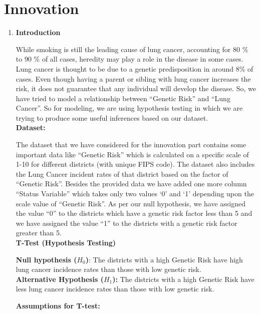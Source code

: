 \documentclass{article}
\begin{document}
	\section{Innovation} 
	
	\begin{enumerate}
		
		\item \textbf{\large Introduction} 
		
		While smoking is still the leading cause of lung cancer, accounting for 80 \% to 90 \% of all cases, heredity may play a role in the disease in some cases. Lung cancer is thought to be due to a genetic predisposition in around 8\% of cases. Even though having a parent or sibling with lung cancer increases the risk, it does not guarantee that any individual will develop the disease. So, we have tried to model a relationship between “Genetic Risk” and “Lung Cancer”. So for modeling, we are using hypothesis testing in which we are trying to produce some useful inferences based on our dataset. \\ 
		
		\textbf{\large Dataset:}   
		
		The dataset that we have considered for the innovation part contains some important data like “Genetic Risk” which is calculated on a specific scale of 1-10 for different districts (with unique FIPS code). The dataset also includes the Lung Cancer incident rates of that district based on the factor of “Genetic Risk”.
		Besides the provided data we have added one more column “Status Variable” which takes only two values ‘0’ and ‘1’ depending upon the scale value of  “Genetic Risk”. As per our null hypothesis, we have assigned the value “0” to the districts which have a genetic risk factor less than 5 and we have assigned the value “1” to the districts with a genetic risk factor greater than 5. 
		\\ 
		
		
		\textbf{\large T-Test (Hypothesis Testing)} 
		
		\textbf{Null hypothesis ($H_{0}$)}: The districts with a high Genetic Risk have high lung cancer incidence rates than those with low genetic risk.\\
		
		\textbf{Alternative Hypothesis ($H_{1}$):} The districts with a high Genetic Risk have less lung cancer incidence rates than those with low genetic risk. 
		
		\textbf{\large Assumptions for T-test:} 
		

\end{enumerate}
\end{document}
